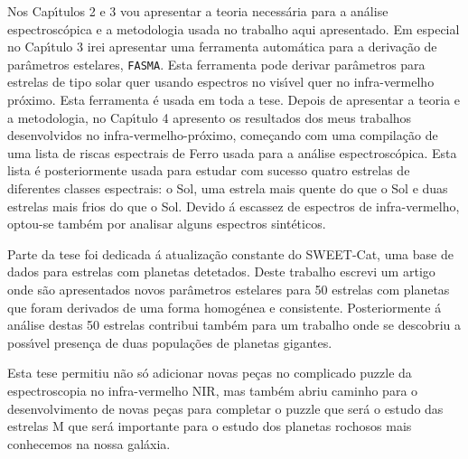 \documentclass[fleqn]{fcup-thesis}
\newcommand{\code}[1]{\texttt{#1}}
\begin{document}
\begin{preliminary}
\begin{abstract-pt}
Nos Cap\'{\i}tulos 2 e 3 vou apresentar a teoria necess\'{a}ria para a an\'{a}lise
espectrosc\'{o}pica e a metodologia usada no trabalho aqui apresentado. Em especial no Cap\'{\i}tulo
3 irei apresentar uma ferramenta autom\'{a}tica para a deriva\c{c}\~{a}o de par\^{a}metros
estelares, \code{FASMA}. Esta ferramenta pode derivar par\^{a}metros para estrelas de tipo solar
quer usando espectros no vis\'{\i}vel quer no infra-vermelho pr\'{o}ximo. Esta ferramenta \'{e}
usada em toda a tese. Depois de apresentar a teoria e a metodologia, no Cap\'{\i}tulo 4 apresento os
resultados dos meus trabalhos desenvolvidos no infra-vermelho-pr\'{o}ximo, come\c{c}ando com uma
compila\c{c}\~{a}o de uma lista de riscas espectrais de Ferro usada para a an\'{a}lise
espectrosc\'{o}pica. Esta lista \'{e} posteriormente usada para estudar com sucesso quatro estrelas
de diferentes classes espectrais: o Sol, uma estrela mais quente do que o Sol e duas estrelas mais
frios do que o Sol. Devido \'{a} escassez de espectros de infra-vermelho, optou-se tamb\'{e}m por
analisar alguns espectros sint\'{e}ticos.

Parte da tese foi dedicada \'{a} atualiza\c{c}\~{a}o constante do SWEET-Cat, uma base de dados para
estrelas com planetas detetados. Deste trabalho escrevi um artigo onde s\~{a}o apresentados novos
par\^{a}metros estelares para 50 estrelas com planetas que foram derivados de uma forma
homog\'{e}nea e consistente. Posteriormente \'{a} an\'{a}lise destas 50 estrelas contribui
tamb\'{e}m para um trabalho onde se descobriu a poss\'{\i}vel presen\c{c}a de duas
popula\c{c}\~{o}es de planetas gigantes.

Esta tese permitiu n\~{a}o s\'{o} adicionar novas pe\c{c}as no complicado puzzle da espectroscopia
no infra-vermelho NIR, mas tamb\'{e}m abriu caminho para o desenvolvimento de novas pe\c{c}as para
completar o puzzle que ser\'{a} o estudo das estrelas M que ser\'{a} importante para o estudo dos
planetas rochosos mais conhecemos na nossa gal\'{a}xia.

\end{abstract-pt}



\tableofcontents
{}
\listoftables
{}
\listoffigures

\end{preliminary}










\appendix






% 


\nocite{} %
\end{document}
